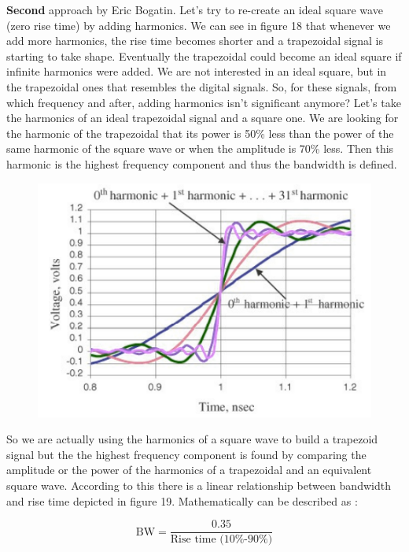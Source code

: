 \documentclass[final]{cubedoc}
\begin{document}
	\textbf{Second} approach by Eric Bogatin. Let's try to re-create an ideal square wave (zero rise time) by adding harmonics. We can see in figure 18 that whenever we add more harmonics, the rise time becomes shorter and a trapezoidal signal is starting to take shape. Eventually the trapezoidal could become an ideal square if infinite harmonics were added. We are not interested in an ideal square, but in the trapezoidal ones that resembles the digital signals. So, for these signals, from which frequency and after, adding harmonics isn't significant anymore? Let's take the harmonics of an ideal trapezoidal signal and a square one. We are looking for the harmonic of the trapezoidal that its power is 50\% less than the power of the same harmonic of the square wave or when the amplitude is 70\% less. Then this harmonic is the highest frequency component and thus the bandwidth is defined.
	
	\begin{figure}[h!]
		\centering
		\includegraphics[keepaspectratio, width = \textwidth, height = .3\textheight]{assets/harmonics.png}
		\caption{\cite{bogatin2009signal}}
	\end{figure}
	
	So we are actually using the harmonics of a square wave to build a trapezoid signal but the the highest frequency component is found by comparing the amplitude or the power of the harmonics of a trapezoidal and an equivalent square wave. According to this there is a linear relationship between bandwidth and rise time depicted in figure 19. Mathematically can be described as \cite{bogatin2009signal}:
	
	\[\text{BW} = \frac{0.35}{\text{Rise time (10\%-90\%)}}\]
	
\end{document}
